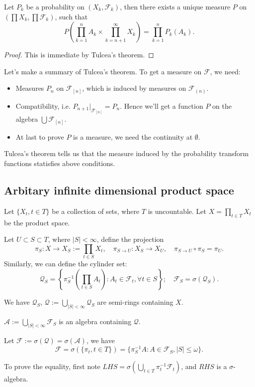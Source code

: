 \begin{theorem}[Kolmogorov]
    Let $P_k$ be a probability on $(X_k, \mathscr{F}_k)$,
	then there exists a unique measure $P$ on $(\prod X_k, \prod \mathscr{F}_k)$,
	such that
	\[
		P\left(\prod_{k=1}^n A_k \times \prod_{k=n+1}^\infty X_k\right)
		= \prod_{k=1}^nP_k(A_k).
	\]
\end{theorem}
\begin{proof}[Proof]
    This is immediate by Tulcea's theorem.
\end{proof}

Let's make a summary of Tulcea's theorem.
To get a measure on $\mathscr{F}$, we need:
\begin{itemize}
	\item Measures $P_n$ on $ \mathscr{F}_{[n]}$,
		which is induced by measures on $ \mathscr{F}_{(n)}$.
	\item Compatibility, i.e. $P_{n+1}|_{\mathscr{F}_{[n]}} = P_n$.
		Hence we'll get a function $P$ on the algebra $\bigcup \mathscr{F}_{[n]}$.
	\item At last to prove $P$ is a measure, we need the continuity at $\emptyset$.
\end{itemize}
Tulcea's theorem tells us that the measure induced by the probability transform
functions statisfies above conditions.

\subsection{Arbitary infinite dimensional product space}
\label{sub:Arbitary infinite dimensional product space}
Let $\{X_t, t\in T\}$ be a collection of sets, where $T$ is uncountable.
Let $X = \prod_{t\in T}X_t$ be the product space.

Let $U \subset S \subset T$, where $|S|<\infty$, define the projection
\[
\pi_S: X\to X_S := \prod_{t\in S}X_t,\quad
\pi_{S\to U}: X_S \to X_U, \quad \pi_{S\to U}\circ \pi_S = \pi_U.
\]
Similarly, we can define the cylinder set:
\[
\mathscr{Q}_S = \left\{\pi_S^{-1}\left(\prod_{t\in S}A_t\right): A_t\in \mathscr{F}_t,
\forall t\in S\right\}; \quad \mathscr{F}_S = \sigma(\mathscr{Q}_S).
\]
\begin{proposition}
	We have $\mathscr{Q}_S$, $\mathscr{Q}:= \bigcup_{|S|<\infty} \mathscr{Q}_S$ are
	semi-rings containing $X$.
\end{proposition}
\begin{proposition}
	$\mathscr{A}:= \bigcup_{|S|< \infty} \mathscr{F}_S$ is an algebra
	containing $\mathscr{Q}$.
\end{proposition}
\begin{proposition}
	Let $\mathscr{F} := \sigma(\mathscr{Q}) = \sigma(\mathscr{A})$, we have
	\[
	\mathscr{F} = \sigma(\{\pi_t, t\in T\}) = \{\pi_S^{-1}A: A\in \mathscr{F}_S,
	|S| \le \omega\}.
	\]
\end{proposition}
\begin{remark}
    To prove the equality, first note $LHS =
	\sigma(\bigcup_{t\in T}\pi_t^{-1}\mathscr{F}_t)$,
	and $RHS$ is a $\sigma$-algebra.
\end{remark}

